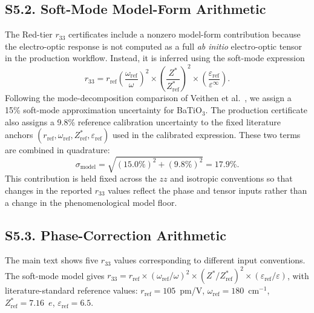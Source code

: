 ﻿\documentclass[prb,onecolumn,superscriptaddress,amsmath,amssymb,longbibliography]{revtex4-2}
\begin{document}
\subsection{S5.2. Soft-Mode Model-Form Arithmetic}

The Red-tier $r_{33}$ certificates include a nonzero model-form contribution
because the electro-optic response is not computed as a full \emph{ab initio}
electro-optic tensor in the production workflow. Instead, it is inferred using
the soft-mode expression
\[
r_{33}=r_{\mathrm{ref}}
\left(\frac{\omega_{\mathrm{ref}}}{\omega}\right)^2
\times
\left(\frac{Z^*}{Z^*_{\mathrm{ref}}}\right)^2
\times
\left(\frac{\varepsilon_{\mathrm{ref}}}{\varepsilon^\infty}\right).
\]
Following the mode-decomposition comparison of Veithen et al.\
\cite{Veithen2005}, we assign a 15\% soft-mode approximation uncertainty for
BaTiO$_3$. The production certificate also assigns a 9.8\% reference
calibration uncertainty to the fixed literature anchors
$(r_{\mathrm{ref}},\omega_{\mathrm{ref}},Z^*_{\mathrm{ref}},
\varepsilon_{\mathrm{ref}})$ used in the calibrated expression. These two
terms are combined in quadrature:
\begin{equation}
    \sigma_{\mathrm{model}}
    =
    \sqrt{(15.0\%)^2 + (9.8\%)^2}
    =
    17.9\%.
\end{equation}
This contribution is held fixed across the $zz$ and isotropic conventions so
that changes in the reported $r_{33}$ values reflect the phase and tensor
inputs rather than a change in the phenomenological model floor.


\subsection{S5.3. Phase-Correction Arithmetic}

The main text shows five $r_{33}$ values corresponding to different
input conventions. The soft-mode model gives $r_{33} = r_{\mathrm{ref}} \times
(\omega_{\mathrm{ref}}/\omega)^2 \times (Z^*/Z^*_{\mathrm{ref}})^2 \times
(\varepsilon_{\mathrm{ref}}/\varepsilon)$, with literature-standard reference
values: $r_{\mathrm{ref}} = 105$~pm/V, $\omega_{\mathrm{ref}} =
180$~cm$^{-1}$, $Z^*_{\mathrm{ref}} = 7.16$~$e$,
$\varepsilon_{\mathrm{ref}} = 6.5$.
\end{document}
